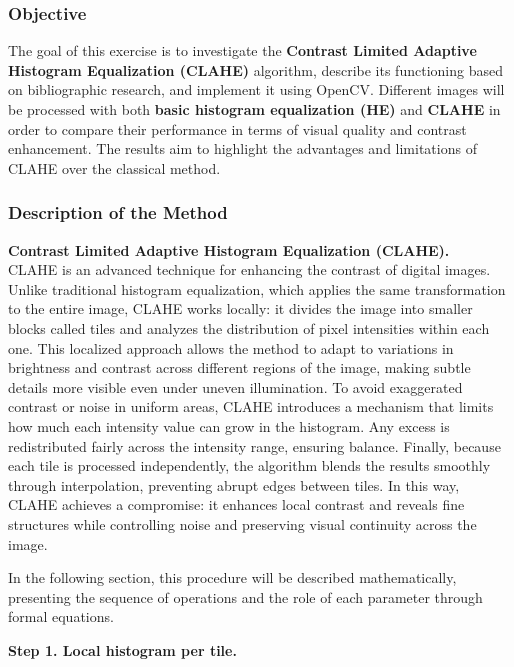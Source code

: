 \documentclass[11pt]{article}
\begin{document}
    \hypertarget{objective}{%
\subsubsection{Objective}\label{objective}}

The goal of this exercise is to investigate the \textbf{Contrast Limited
Adaptive Histogram Equalization (CLAHE)} algorithm, describe its
functioning based on bibliographic research, and implement it using
OpenCV. Different images will be processed with both \textbf{basic
histogram equalization (HE)} and \textbf{CLAHE} in order to compare
their performance in terms of visual quality and contrast enhancement.
The results aim to highlight the advantages and limitations of CLAHE
over the classical method.

    \hypertarget{description-of-the-method}{%
\subsubsection{Description of the
Method}\label{description-of-the-method}}

\textbf{Contrast Limited Adaptive Histogram Equalization (CLAHE).}\\
CLAHE is an advanced technique for enhancing the contrast of digital
images. Unlike traditional histogram equalization, which applies the
same transformation to the entire image, CLAHE works locally: it divides
the image into smaller blocks called tiles and analyzes the distribution
of pixel intensities within each one. This localized approach allows the
method to adapt to variations in brightness and contrast across
different regions of the image, making subtle details more visible even
under uneven illumination. To avoid exaggerated contrast or noise in
uniform areas, CLAHE introduces a mechanism that limits how much each
intensity value can grow in the histogram. Any excess is redistributed
fairly across the intensity range, ensuring balance. Finally, because
each tile is processed independently, the algorithm blends the results
smoothly through interpolation, preventing abrupt edges between tiles.
In this way, CLAHE achieves a compromise: it enhances local contrast and
reveals fine structures while controlling noise and preserving visual
continuity across the image.

In the following section, this procedure will be described
mathematically, presenting the sequence of operations and the role of
each parameter through formal equations.

\textbf{Step 1. Local histogram per tile.}
\end{document}
